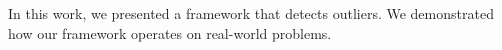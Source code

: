 
In this work, we presented a framework that detects outliers.
We demonstrated how our framework operates on real-world problems.

